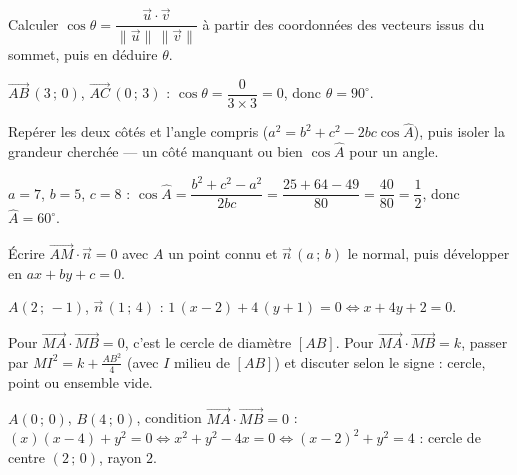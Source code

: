 Calculer $\cos\theta=\dfrac{\vec{u}\cdot\vec{v}}{\|\vec{u}\|\,\|\vec{v}\|}$ à partir des
coordonnées des vecteurs issus du sommet, puis en déduire $\theta$.
\begin{exemple}
$\vec{AB}\,(3\,;\,0)$, $\vec{AC}\,(0\,;\,3)$ :
$\cos\theta=\dfrac{0}{3\times3}=0$, donc $\theta=90^\circ$.
\end{exemple}

Repérer les deux côtés et l'angle compris ($a^2=b^2+c^2-2bc\cos\widehat{A}$), puis
isoler la grandeur cherchée — un côté manquant ou bien $\cos\widehat{A}$ pour un angle.
\begin{exemple}
$a=7$, $b=5$, $c=8$ : $\cos\widehat{A}=\dfrac{b^2+c^2-a^2}{2bc}
=\dfrac{25+64-49}{80}=\dfrac{40}{80}=\dfrac12$, donc $\widehat{A}=60^\circ$.
\end{exemple}

Écrire $\vec{AM}\cdot\vec{n}=0$ avec $A$ un point connu et $\vec{n}\,(a\,;\,b)$ le
normal, puis développer en $ax+by+c=0$.
\begin{exemple}
$A(2\,;\,-1)$, $\vec{n}\,(1\,;\,4)$ :
$1\,(x-2)+4\,(y+1)=0\iff x+4y+2=0$.
\end{exemple}

Pour $\vec{MA}\cdot\vec{MB}=0$, c'est le cercle de diamètre $[AB]$. Pour
$\vec{MA}\cdot\vec{MB}=k$, passer par $MI^2=k+\frac{AB^2}{4}$ (avec $I$ milieu de
$[AB]$) et discuter selon le signe : cercle, point ou ensemble vide.
\begin{exemple}
$A(0\,;\,0)$, $B(4\,;\,0)$, condition $\vec{MA}\cdot\vec{MB}=0$ :
$(x)(x-4)+y^2=0\iff x^2+y^2-4x=0\iff (x-2)^2+y^2=4$ : cercle de centre $(2\,;\,0)$,
rayon $2$.
\end{exemple}
